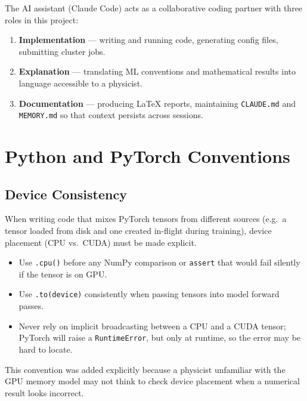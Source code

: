 \documentclass[11pt]{article}
\begin{document}
The AI assistant (Claude Code) acts as a collaborative coding partner
with three roles in this project:
\begin{enumerate}[leftmargin=1.5em]
  \item \textbf{Implementation} --- writing and running code, generating
        config files, submitting cluster jobs.
  \item \textbf{Explanation} --- translating ML conventions and
        mathematical results into language accessible to a physicist.
  \item \textbf{Documentation} --- producing \LaTeX{} reports,
        maintaining \texttt{CLAUDE.md} and \texttt{MEMORY.md} so that
        context persists across sessions.
\end{enumerate}

\section{Python and PyTorch Conventions}
\label{sec:coding}

\subsection{Device Consistency}

When writing code that mixes PyTorch tensors from different sources
(e.g.\ a tensor loaded from disk and one created in-flight during
training), device placement (CPU vs.\ CUDA) must be made explicit.

\begin{itemize}[leftmargin=1.5em]
  \item Use \texttt{.cpu()} before any NumPy comparison or
        \texttt{assert} that would fail silently if the tensor is on
        GPU.
  \item Use \texttt{.to(device)} consistently when passing tensors into
        model forward passes.
  \item Never rely on implicit broadcasting between a CPU and a CUDA
        tensor; PyTorch will raise a \texttt{RuntimeError}, but only at
        runtime, so the error may be hard to locate.
\end{itemize}

This convention was added explicitly because a physicist unfamiliar
with the GPU memory model may not think to check device placement when
a numerical result looks incorrect.
\end{document}
